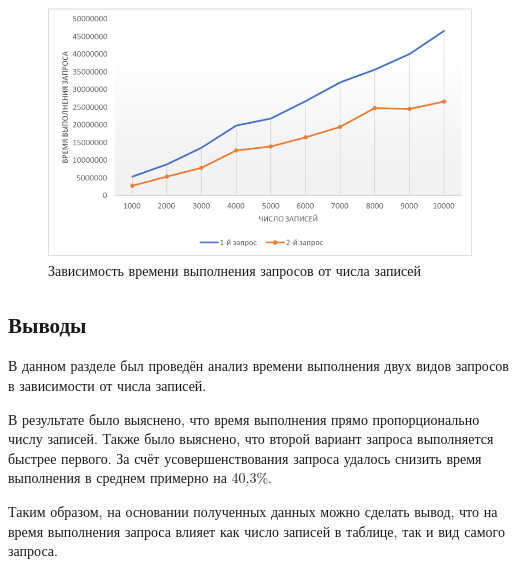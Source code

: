 \begin{figure}[h!]
	\begin{center}
		\includegraphics[scale=1.1]{inc/img/graph.png}
	\end{center}
	\captionsetup{justification=centering}
	\caption{\label{img:graph} Зависимость времени выполнения запросов от числа записей}
\end{figure}


\subsection*{Выводы}
В данном разделе был проведён анализ времени выполнения двух видов запросов в зависимости от числа записей. 

В результате было выяснено, что время выполнения прямо пропорционально числу записей. Также было выяснено, что второй вариант запроса выполняется быстрее первого. За счёт усовершенствования запроса удалось снизить время выполнения в среднем примерно на 40,3\%.

Таким образом, на основании полученных данных можно сделать вывод, что на время выполнения запроса влияет как число записей в таблице, так и вид самого запроса.

